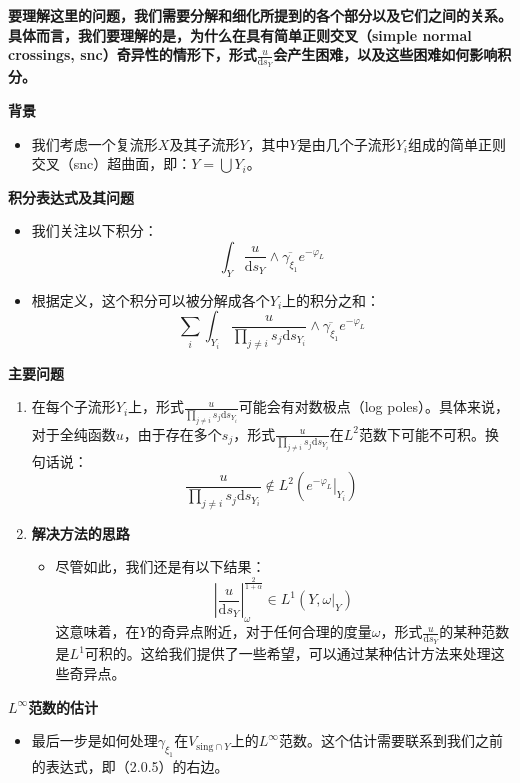 \begin{solution}

\textbf{要理解这里的问题，我们需要分解和细化所提到的各个部分以及它们之间的关系。具体而言，我们要理解的是，为什么在具有简单正则交叉（simple normal crossings, snc）奇异性的情形下，形式$\frac{u}{\mathrm{d} s_Y}$会产生困难，以及这些困难如何影响积分。}

\textbf{背景}
\begin{itemize}
    \item 我们考虑一个复流形$X$及其子流形$Y$，其中$Y$是由几个子流形$Y_i$组成的简单正则交叉（snc）超曲面，即：$Y = \bigcup Y_i$。
\end{itemize}

\textbf{积分表达式及其问题}
\begin{itemize}
    \item 我们关注以下积分：
    \[
    \int_Y \frac{u}{\mathrm{d} s_Y} \wedge \overline{\gamma_{\xi_1}} e^{-\varphi_L}
    \]
    \item 根据定义，这个积分可以被分解成各个$Y_i$上的积分之和：
    \[
    \sum_i \int_{Y_i} \frac{u}{\prod_{j \neq i} s_j \mathrm{d} s_{Y_i}} \wedge \overline{\gamma_{\xi_1}} e^{-\varphi_L}
    \]
\end{itemize}

\textbf{主要问题}
\begin{enumerate}
    \item 在每个子流形$Y_i$上，形式$\frac{u}{\prod_{j \neq i} s_j \mathrm{d} s_{Y_i}}$可能会有对数极点（log poles）。具体来说，对于全纯函数$u$，由于存在多个$s_j$，形式$\frac{u}{\prod_{j \neq i} s_j \mathrm{d} s_{Y_i}}$在$L^2$范数下可能不可积。换句话说：
    \[
    \frac{u}{\prod_{j \neq i} s_j \mathrm{d} s_{Y_i}} \notin L^2\left(\left.e^{-\varphi_L}\right|_{Y_i}\right)
    \]
    \item \textbf{解决方法的思路}
    \begin{itemize}
        \item 尽管如此，我们还是有以下结果：
        \[
        \left|\frac{u}{\mathrm{d} s_Y}\right|_\omega^{\frac{2}{1+\alpha}} \in L^1\left(Y,\left.\omega\right|_Y\right)
        \]
        这意味着，在$Y$的奇异点附近，对于任何合理的度量$\omega$，形式$\frac{u}{\mathrm{d} s_Y}$的某种范数是$L^1$可积的。这给我们提供了一些希望，可以通过某种估计方法来处理这些奇异点。
    \end{itemize}
\end{enumerate}

\textbf{$L^{\infty}$范数的估计}
\begin{itemize}
    \item 最后一步是如何处理$\gamma_{\xi_1}$在$V_{\text{sing} \cap Y}$上的$L^{\infty}$范数。这个估计需要联系到我们之前的表达式，即（2.0.5）的右边。
\end{itemize}


\end{solution}
